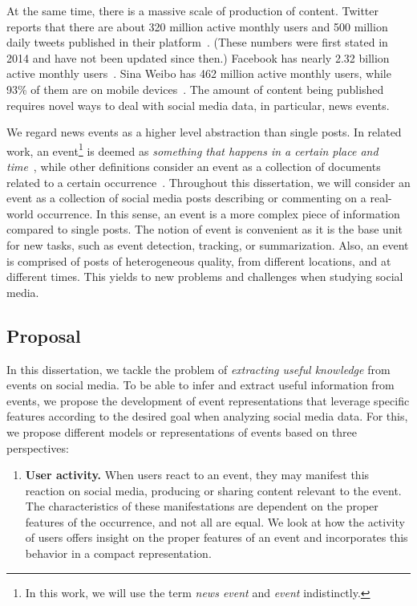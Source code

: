 \begin{intro}

At the same time, there is a massive scale of production of content. 
%
Twitter reports that there are about 320 million active monthly users and 500
million daily tweets published in their platform~\cite{twitter2014}. 
%
(These numbers were first stated in 2014 and have not been updated since then.)
%
Facebook has nearly 2.32 billion active monthly users~\cite{fbnewsroom}. 
%
Sina Weibo has 462 million active monthly users, while 93\% of them are on
mobile devices~\cite{chinawatch}.
%
The amount of content being published requires novel ways to deal with social
media data, in particular, news events.



We regard news events as a higher level abstraction than single
posts.
%
In related work, an event\footnote{In this work, we will use the term {\em news
event} and {\em event} indistinctly.} is deemed as {\em something that happens
in a certain place and time}~\cite{yang1999learning}, while other definitions
consider an event as a collection of documents related to a certain
occurrence~\cite{Becker:2010:LSM:1718487.1718524}.
%
Throughout this dissertation, we will consider an event as a collection of
social media posts describing or commenting on a real-world occurrence.
%
In this sense, an event is a more complex piece of information compared to
single posts.
%
The notion of event is convenient as it is the base unit for new tasks, such as
event detection, tracking, or summarization.
%
Also, an event is comprised of posts of heterogeneous quality, from different
locations, and at different times.
%
This yields to new problems and challenges when studying social media.



\subsection*{Proposal}

In this dissertation, we tackle the problem of {\em extracting useful knowledge}
from events on social media. 
%
To be able to infer and extract useful information from events, we propose the
development of event representations that leverage specific features according
to the desired goal when analyzing social media data.
%
For this, we propose different models or representations of events based on
three perspectives:
%

\begin{enumerate}
    \item {\bf User activity.} 
    When users react to an event, they may manifest this reaction on social
    media, producing or sharing content relevant to the event. 
    The characteristics of these manifestations are dependent on the proper
    features of the occurrence, and not all are equal. 
    We look at how the activity of users offers insight on the proper
    features of an event and incorporates this behavior in a compact
    representation.


\end{enumerate}
\end{intro}
